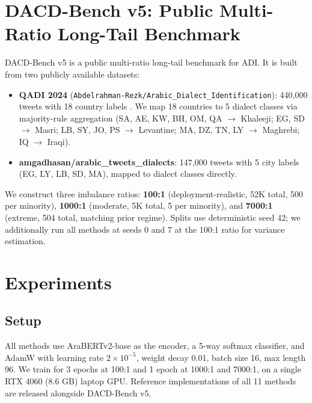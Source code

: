 \documentclass[11pt,a4paper,twocolumn]{article}
\newcommand{\bench}{DACD-Bench}
\begin{document}
\section{\bench{} v5: Public Multi-Ratio Long-Tail Benchmark}
\label{sec:bench}
\bench{} v5 is a public multi-ratio long-tail benchmark for ADI. It
is built from two publicly available datasets:
\begin{itemize}\itemsep0pt
\item \textbf{QADI 2024} (\texttt{Abdelrahman-Rezk/Arabic\_Dialect\_Identification}):
440{,}000 tweets with 18 country labels \citep{Abdelrahman-Rezk2020QADI}.
We map 18 countries to 5 dialect classes via majority-rule
aggregation (SA, AE, KW, BH, OM, QA $\to$ Khaleeji; EG, SD $\to$
Masri; LB, SY, JO, PS $\to$ Levantine; MA, DZ, TN, LY $\to$ Maghrebi;
IQ $\to$ Iraqi).
\item \textbf{amgadhasan/arabic\_tweets\_dialects}: 147{,}000 tweets
with 5 city labels (EG, LY, LB, SD, MA), mapped to dialect classes
directly.
\end{itemize}

We construct three imbalance ratios:
\textbf{100:1} (deployment-realistic, 52K total, 500 per minority),
\textbf{1000:1} (moderate, 5K total, 5 per minority), and
\textbf{7000:1} (extreme, 504 total, matching prior \citep{Cao2019ldam}
regime). Splits use deterministic seed 42; we additionally run all
methods at seeds 0 and 7 at the 100:1 ratio for variance estimation.

\section{Experiments}
\label{sec:experiments}

\subsection{Setup}
All methods use AraBERTv2-base \citep{Antoun2020} as the encoder, a
5-way softmax classifier, and AdamW with learning rate $2{\times}10^{-5}$,
weight decay 0.01, batch size 16, max length 96. We train for 3
epochs at 100:1 and 1 epoch at 1000:1 and 7000:1, on a single RTX
4060 (8.6 GB) laptop GPU. Reference implementations of all 11 methods
are released alongside \bench{} v5.
\end{document}
